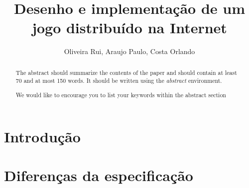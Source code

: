 \documentclass[runningheads,a4paper]{llncs}
\newcommand{\keywords}[1]{\par\addvspace\baselineskip
\noindent\keywordname\enspace\ignorespaces#1}
\begin{document}
\mainmatter  %

\title{Desenho e implementação de um jogo distribuído na Internet}


%
%
\author{Oliveira Rui, Araujo Paulo, Costa Orlando}
%


%
%

\maketitle


\begin{abstract}
The abstract should summarize the contents of the paper and should
contain at least 70 and at most 150 words. It should be written using the
\emph{abstract} environment.
\keywords{We would like to encourage you to list your keywords within
the abstract section}
\end{abstract}


\section{Introdução}

\section{Diferenças da especificação}
\end{document}
